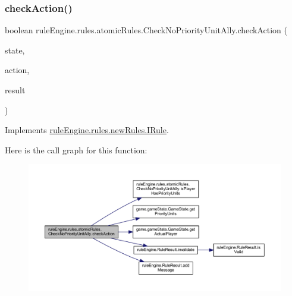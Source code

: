 \subsubsection{\texorpdfstring{check\+Action()}{checkAction()}}
{\footnotesize\ttfamily boolean rule\+Engine.\+rules.\+atomic\+Rules.\+Check\+No\+Priority\+Unit\+Ally.\+check\+Action (\begin{DoxyParamCaption}\item[{\mbox{\hyperlink{classgame_1_1game_state_1_1_game_state}{Game\+State}}}]{state,  }\item[{\mbox{\hyperlink{classrule_engine_1_1_game_action}{Game\+Action}}}]{action,  }\item[{\mbox{\hyperlink{classrule_engine_1_1_rule_result}{Rule\+Result}}}]{result }\end{DoxyParamCaption})\hspace{0.3cm}{\ttfamily [inline]}}



Implements \mbox{\hyperlink{interfacerule_engine_1_1rules_1_1new_rules_1_1_i_rule_a72ce29a47d7a5fba75a09444a50a481e}{rule\+Engine.\+rules.\+new\+Rules.\+I\+Rule}}.

Here is the call graph for this function\+:
\nopagebreak
\begin{figure}[H]
\begin{center}
\leavevmode
\includegraphics[width=350pt]{classrule_engine_1_1rules_1_1atomic_rules_1_1_check_no_priority_unit_ally_a03dc1a2792b2e7bcbfa789d328566565_cgraph}
\end{center}
\end{figure}
\mbox{\label{classrule_engine_1_1rules_1_1atomic_rules_1_1_check_no_priority_unit_ally_a45452c6d7649a9fdeef92f68eec43726}} 
